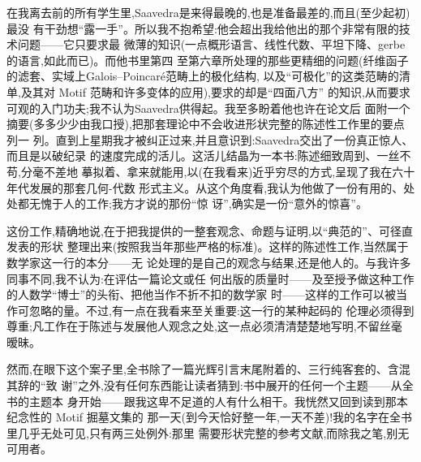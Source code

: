 在我离去前的所有学生里,Saavedra是来得最晚的,也是准备最差的,而且(至少起初)最没
有干劲想“露一手”。所以我不抱希望:他会超出我给他出的那个非常有限的技术问题——它只要求最
微薄的知识(一点概形语言、线性代数、平坦下降、gerbe 的语言,如此而已)。而他书里第四
至第六章所处理的那些更精细的问题(纤维函子的滤套、实域上Galois--Poincaré范畴上的极化结构,
以及“可极化”的这类范畴的清单,及其对 Motif 范畴和许多变体的应用),要求的却是“四面八方”
的知识,从而要求可观的入门功夫;我不认为Saavedra供得起。我至多盼着他也许在论文后
面附一个摘要(多多少少由我口授),把那套理论中不会收进形状完整的陈述性工作里的要点列一
列。直到上星期我才被纠正过来,并且意识到:Saavedra交出了一份真正惊人、而且是以破纪录
的速度完成的活儿\dmark{}。这活儿结晶为一本书:陈述细致周到、一丝不苟,分毫不差地
摹拟着、拿来就能用,以(在我看来)近乎穷尽的方式,呈现了我在六十年代发展的那套几何-代数
形式主义。从这个角度看,我认为他做了一份有用的、处处都无愧于人的工作;我方才说的那份“惊
讶”,确实是一份“意外的惊喜”。

这份工作,精确地说,在于把我提供的一整套观念、命题与证明,以“典范的”、可径直发表的形状
整理出来(按照我当年那些严格的标准)。这样的陈述性工作,当然属于数学家这一行的本分——无
论处理的是自己的观念与结果,还是他人的。与我许多同事不同,我不认为:在评估一篇论文或任
何出版的质量时——及至授予做这种工作的人数学“博士”的头衔、把他当作不折不扣的数学家
时——这样的工作可以被当作可忽略的量。不过,有一点在我看来至关重要:这一行的某种起码的
伦理必须得到尊重;凡工作在于陈述与发展他人观念之处,这一点必须清清楚楚地写明,不留丝毫
暧昧。

然而,在眼下这个案子里,全书除了一篇光辉引言末尾附着的、三行纯客套的、含混其辞的“致
谢”之外,没有任何东西能让读者猜到:书中展开的任何一个主题——从全书的主题本
身开始——跟我这卑不足道的人有什么相干。我恍然又回到读到那本纪念性的 Motif 掘墓文集的
那一天(到今天恰好整一年,一天不差)!我的名字在全书里几乎无处可见,只有两三处例外:那里
需要形状完整的参考文献,而除我之笔,别无可用者\dmark{}。

